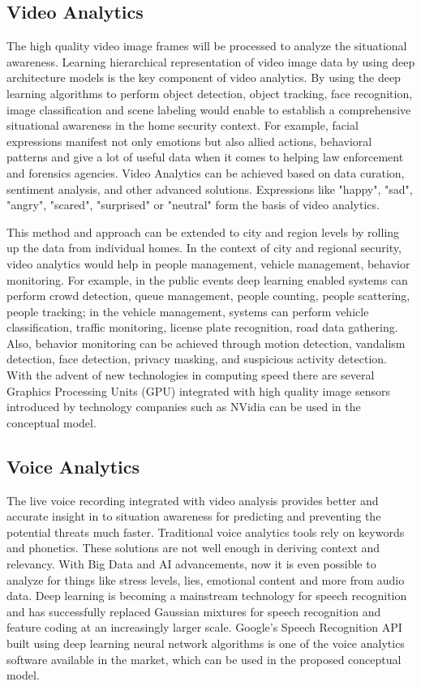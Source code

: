 \documentclass[sigconf]{acmart}
\begin{document}
\subsection{Video Analytics}
The high quality video image frames will be processed to analyze the situational awareness. Learning hierarchical representation of video image data by using deep architecture models is the key component of video analytics. By using the deep learning algorithms to perform object detection, object tracking, face recognition, image classification and scene labeling would enable to establish a comprehensive situational awareness in the home security context. For example, facial expressions manifest not only emotions but also allied actions, behavioral patterns and give a lot of useful data when it comes to helping law enforcement and forensics agencies. Video Analytics can be achieved based on data curation, sentiment analysis, and other advanced solutions. Expressions like "happy", "sad", "angry", "scared", "surprised" or "neutral" form the basis of video analytics.

This method and approach can be extended to city and region levels by rolling up the data from individual homes. In the context of city and regional security, video analytics would help in people management, vehicle management, behavior monitoring. For example, in the public events deep learning enabled systems can  perform crowd detection, queue management, people counting, people scattering, people tracking; in the vehicle management, systems can perform vehicle classification, traffic monitoring, license plate recognition, road data gathering. Also, behavior monitoring can be achieved through motion detection, vandalism detection, face detection, privacy masking, and suspicious activity detection.
With the advent of new technologies in computing speed there are several Graphics Processing Units (GPU) integrated with high quality image sensors  introduced by technology companies such as NVidia can be used in the conceptual model.

\subsection{Voice Analytics}
The live voice recording integrated with video analysis provides better and accurate insight in to situation awareness for predicting and preventing the potential threats much faster. Traditional voice analytics tools rely on keywords and phonetics. These solutions are not well enough in deriving context and relevancy. With Big Data and AI advancements, now it is even possible to analyze for things like stress levels, lies, emotional content and more from audio data. Deep learning is becoming a mainstream technology for speech recognition and has successfully replaced Gaussian mixtures for speech recognition and feature coding at an increasingly larger scale. Google’s Speech Recognition API built using deep learning neural network algorithms is one of the voice analytics software available in the market, which can be used in the proposed conceptual model.
\end{document}
